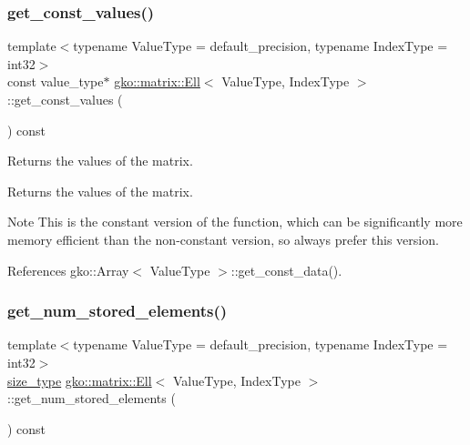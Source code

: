 \mbox{\label{classgko_1_1matrix_1_1Ell_a5bc4d3c67b328b353409e76eb9f70803}} 
\subsubsection{\texorpdfstring{get\+\_\+const\+\_\+values()}{get\_const\_values()}}
{\footnotesize\ttfamily template$<$typename Value\+Type = default\+\_\+precision, typename Index\+Type = int32$>$ \\
const value\+\_\+type$\ast$ \hyperlink{classgko_1_1matrix_1_1Ell}{gko\+::matrix\+::\+Ell}$<$ Value\+Type, Index\+Type $>$\+::get\+\_\+const\+\_\+values (\begin{DoxyParamCaption}{ }\end{DoxyParamCaption}) const\hspace{0.3cm}{\ttfamily [noexcept]}}



Returns the values of the matrix. 

\begin{DoxyReturn}{Returns}
the values of the matrix.
\end{DoxyReturn}
\begin{DoxyNote}{Note}
This is the constant version of the function, which can be significantly more memory efficient than the non-\/constant version, so always prefer this version. 
\end{DoxyNote}


References gko\+::\+Array$<$ Value\+Type $>$\+::get\+\_\+const\+\_\+data().

\mbox{\label{classgko_1_1matrix_1_1Ell_aecca4e9cfb1e81958881c6dc3e2aa06f}} 
\subsubsection{\texorpdfstring{get\+\_\+num\+\_\+stored\+\_\+elements()}{get\_num\_stored\_elements()}}
{\footnotesize\ttfamily template$<$typename Value\+Type = default\+\_\+precision, typename Index\+Type = int32$>$ \\
\hyperlink{namespacegko_a6e5c95df0ae4e47aab2f604a22d98ee7}{size\+\_\+type} \hyperlink{classgko_1_1matrix_1_1Ell}{gko\+::matrix\+::\+Ell}$<$ Value\+Type, Index\+Type $>$\+::get\+\_\+num\+\_\+stored\+\_\+elements (\begin{DoxyParamCaption}{ }\end{DoxyParamCaption}) const\hspace{0.3cm}{\ttfamily [noexcept]}}



